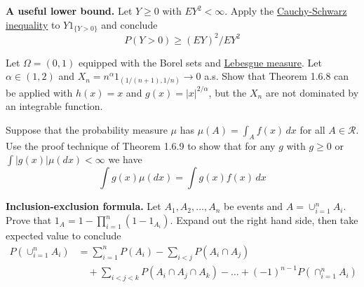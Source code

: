   \begin{exercise}[Durrett 1.6.6]
    \textbf{A useful lower bound.} Let $Y \geq 0$ with $EY^2 < \infty$. Apply the \hyperref[lin-thm:cauchy-schwarz-inequality]{Cauchy-Schwarz inequality} to $Y 1_{\{Y > 0\}}$ and conclude
    \begin{equation*}
      P(Y > 0) \geq (EY)^2 / EY^2
    \end{equation*}
  \end{exercise}
  \begin{solution}

  \end{solution}

  \begin{exercise}[Durrett 1.6.7]
    Let $\Omega = (0, 1)$ equipped with the Borel sets and \hyperref[mt-def:lebesgue-measure]{Lebesgue measure}. Let $\alpha \in (1, 2)$ and $X_n = n^{\alpha} 1_{(1/(n+1), 1/n)} \to 0$ a.s. Show that Theorem 1.6.8 can be applied with $h(x) = x$ and $g(x) = |x|^{2/\alpha}$, but the $X_n$ are not dominated by an integrable function.
  \end{exercise}
  \begin{solution}

  \end{solution}

  \begin{exercise}[Durrett 1.6.8]
    Suppose that the probability measure $\mu$ has $\mu(A) = \int_A f(x) \, dx$ for all $A \in \mathcal{R}$. Use the proof technique of Theorem 1.6.9 to show that for any $g$ with $g \geq 0$ or $\int |g(x)| \mu(dx) < \infty$ we have
    \begin{equation*}
      \int g(x) \mu(dx) = \int g(x) f(x) \, dx
    \end{equation*}
  \end{exercise}
  \begin{solution}

  \end{solution}

  \begin{exercise}[Durrett 1.6.9]
    \textbf{Inclusion-exclusion formula.} Let $A_1, A_2, \dots, A_n$ be events and $A = \cup_{i=1}^{n} A_i$. Prove that $1_A = 1 - \prod_{i=1}^n (1 - 1_{A_i})$. Expand out the right hand side, then take expected value to conclude
    \begin{align*}
      P(\cup_{i=1}^n A_i) &= \sum_{i=1}^n P(A_i) - \sum_{i<j} P(A_i \cap A_j) \\
      &\quad + \sum_{i<j<k} P(A_i \cap A_j \cap A_k) - \dots + (-1)^{n-1} P(\cap_{i=1}^n A_i)
    \end{align*}
  \end{exercise}
  \begin{solution}

  \end{solution}

